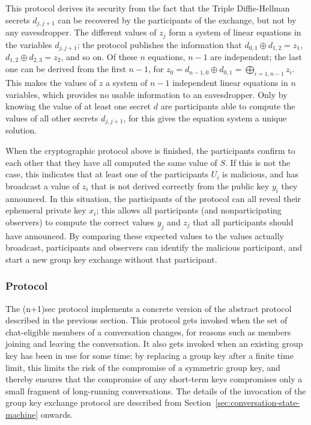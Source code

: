 \documentclass{article}
\def\xor{\oplus}
\begin{document}
This protocol derives its security from the fact that the Triple Diffie-Hellman secrets $d_{j, j+1}$ can be recovered by the participants of the exchange, but not by any eavesdropper.
The different values of $z_j$ form a system of linear equations in the variables $d_{j, j+1}$; the protocol publishes the information that $d_{0, 1} \xor d_{1, 2} = z_{1}$, $d_{1, 2} \xor d_{2, 3} = z_2$, and so on.
Of these $n$ equations, $n - 1$ are independent; the last one can be derived from the first $n - 1$, for $z_0 = d_{n-1, 0} \xor d_{0, 1} = \bigoplus_{i=1, n-1} z_i$.
This makes the values of $z$ a system of $n - 1$ independent linear equations in $n$ variables, which provides no usable information to an eavesdropper.
Only by knowing the value of at least one secret $d$ are participants able to compute the values of all other secrets $d_{j, j+1}$, for this gives the equation system a unique solution.

When the cryptographic protocol above is finished, the participants confirm to each other that they have all computed the same value of $S$.
If this is not the case, this indicates that at least one of the participants $U_i$ is malicious, and has broadcast a value of $z_i$ that is not derived correctly from the public key $y_i$ they announced.
In this situation, the participants of the protocol can all reveal their ephemeral private key $x_i$; this allows all participants (and nonparticipating observers) to compute the correct values $y_j$ and $z_j$ that all participants should have announced.
By comparing these expected values to the values actually broadcast, participants and observers can identify the malicious participant, and start a new group key exchange without that participant.


\subsubsection{Protocol}
\label{sec:cryptography/group-key-exchange/protocol}

The (n+1)sec protocol implements a concrete version of the abstract protocol described in the previous section.
This protocol gets invoked when the set of chat-eligible members of a conversation changes, for reasons such as members joining and leaving the conversation.
It also gets invoked when an existing group key has been in use for some time; by replacing a group key after a finite time limit, this limits the risk of the compromise of a symmetric group key, and thereby ensures that the compromise of any short-term keys compromises only a small fragment of long-running conversations.
The details of the invocation of the group key exchange protocol are described from Section~\ref{sec:conversation-state-machine} onwards.
\end{document}
